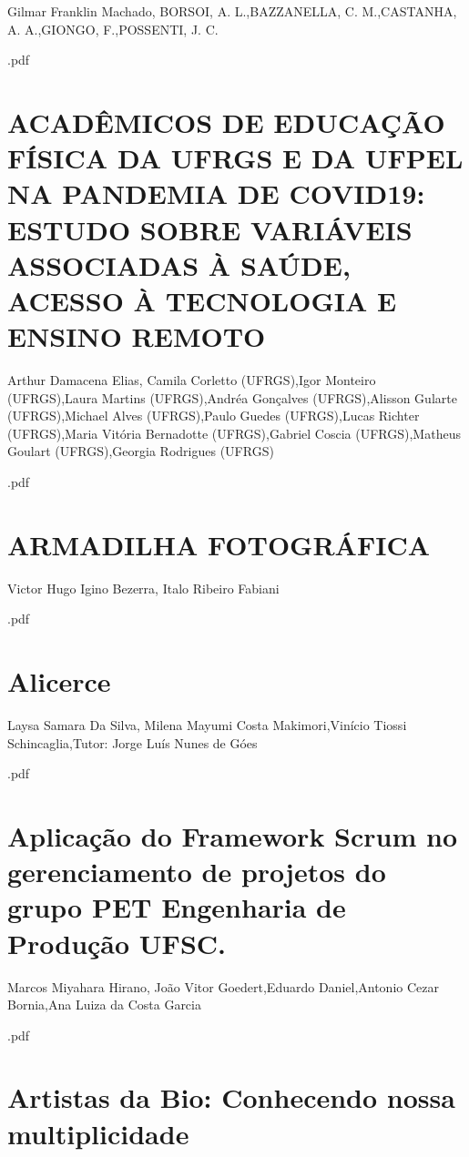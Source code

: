 Gilmar Franklin Machado, BORSOI, A. L.,BAZZANELLA, C. M.,CASTANHA, A. A.,GIONGO, F.,POSSENTI, J. C.



.pdf\section{ACADÊMICOS DE EDUCAÇÃO FÍSICA DA UFRGS E DA UFPEL NA PANDEMIA DE COVID19: ESTUDO SOBRE VARIÁVEIS ASSOCIADAS À SAÚDE, ACESSO À TECNOLOGIA E ENSINO REMOTO }

Arthur Damacena Elias, Camila Corletto (UFRGS),Igor Monteiro (UFRGS),Laura Martins (UFRGS),Andréa Gonçalves (UFRGS),Alisson Gularte (UFRGS),Michael Alves (UFRGS),Paulo Guedes (UFRGS),Lucas Richter (UFRGS),Maria Vitória Bernadotte (UFRGS),Gabriel Coscia (UFRGS),Matheus Goulart (UFRGS),Georgia Rodrigues (UFRGS)



.pdf\section{ARMADILHA FOTOGRÁFICA}

Victor Hugo Igino Bezerra, Italo Ribeiro Fabiani



.pdf\section{Alicerce}

Laysa Samara Da Silva, Milena Mayumi Costa Makimori,Vinício Tiossi  Schincaglia,Tutor: Jorge Luís Nunes de Góes



.pdf\section{Aplicação do Framework Scrum no gerenciamento de projetos do grupo PET Engenharia de Produção UFSC.}

Marcos Miyahara Hirano, João Vitor Goedert,Eduardo Daniel,Antonio Cezar Bornia,Ana Luiza da Costa Garcia



.pdf\section{Artistas da Bio: Conhecendo nossa multiplicidade}

